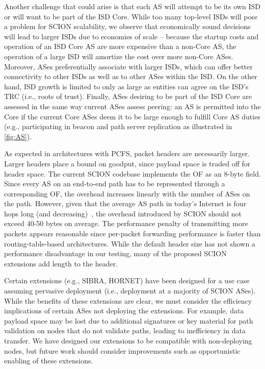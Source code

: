 \documentclass[a4paper]{llncs}
\newcommand\SCION{{\small\textsf{SCION}}\xspace}
\begin{document}
Another challenge that could arise is that each AS will attempt to be its own
ISD or will want to be part of the ISD Core.
While too many top-level ISDs will pose a problem for \SCION scalability,
we observe that economically sound decisions will lead to larger ISDs due to
economies of scale -- because the startup costs and operation of an ISD Core AS
are more expensive than a non-Core AS, the operation of a large ISD will amortize
the cost over more non-Core ASes. Moreover, ASes preferentially associate with
larger ISDs, which can offer better connectivity to other ISDs as well as to
other ASes within the ISD. On the other hand, ISD growth is limited to only as
large as entities can agree on the ISD's TRC (i.e., roots of trust). Finally,
ASes desiring to be part of the ISD Core are assessed in the same way current
ASes assess peering: an AS is permitted into the Core if the current Core ASes
deem it to be large enough to fulfill Core AS duties (e.g., participating in
beacon and path server replication as illustrated in \autoref{fig:AS}).

As expected in architectures with PCFS, packet headers are necessarily larger.
Larger headers place a bound on goodput, since payload space is traded off for
header space. The current \SCION codebase implements the OF as an 8-byte field.
Since every AS on an end-to-end path has to be represented through a corresponding OF,
the overhead increases linearly with the number of ASes on the path.
However, given that the average AS path in today's Internet is four hops long (and
decreasing)~\cite{caida_twelve,avg_as}, the overhead introduced by SCION should
not exceed 40-50 bytes on average.  The performance penalty of transmitting more
packets appears reasonable since per-packet forwarding performance is
faster than routing-table-based architectures. While the default
header size has not shown a performance disadvantage in our testing, many of the
proposed \SCION extensions add length to the header.

Certain extensions (e.g., SIBRA, HORNET) have been designed for a use case
assuming pervasive deployment (i.e., deployment at a majority of \SCION ASes).
While the benefits of these extensions are clear, we must consider the
efficiency implications of certain ASes not deploying the extensions. For
example, data payload space may be lost due to additional signatures or key
material for path validation on nodes that do not validate paths, leading to
inefficiency in data transfer. We have designed our extensions to be compatible
with non-deploying nodes, but future work should consider improvements such as
opportunistic enabling of these extensions.
\end{document}
